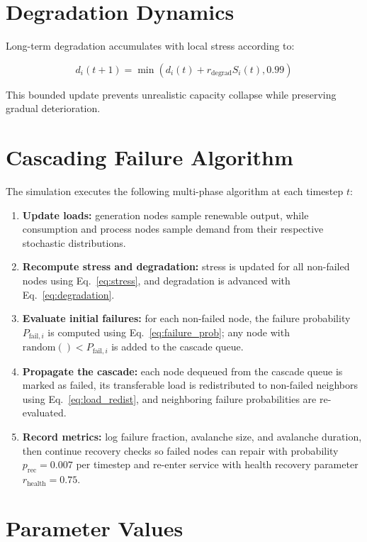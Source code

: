 \documentclass[12pt,a4paper,twoside]{report}
\begin{document}
\section{Degradation Dynamics}

Long-term degradation accumulates with local stress according to:

\begin{equation}
d_i(t+1) = \min\left(d_i(t) + r_{\text{degrad}} S_i(t), 0.99\right)
\label{eq:degradation}
\end{equation}

This bounded update prevents unrealistic capacity collapse while preserving gradual deterioration.

\section{Cascading Failure Algorithm}

The simulation executes the following multi-phase algorithm at each timestep $t$:

\begin{enumerate}
\item \textbf{Update loads:} generation nodes sample renewable output, while consumption and process nodes sample demand from their respective stochastic distributions.
\item \textbf{Recompute stress and degradation:} stress is updated for all non-failed nodes using Eq.~\eqref{eq:stress}, and degradation is advanced with Eq.~\eqref{eq:degradation}.
\item \textbf{Evaluate initial failures:} for each non-failed node, the failure probability $P_{\text{fail},i}$ is computed using Eq.~\eqref{eq:failure_prob}; any node with $\text{random}() < P_{\text{fail},i}$ is added to the cascade queue.
\item \textbf{Propagate the cascade:} each node dequeued from the cascade queue is marked as failed, its transferable load is redistributed to non-failed neighbors using Eq.~\eqref{eq:load_redist}, and neighboring failure probabilities are re-evaluated.
\item \textbf{Record metrics:} log failure fraction, avalanche size, and avalanche duration, then continue recovery checks so failed nodes can repair with probability $p_{\text{rec}} = 0.007$ per timestep and re-enter service with health recovery parameter $r_{\text{health}} = 0.75$.
\end{enumerate}

\section{Parameter Values}
\end{document}
